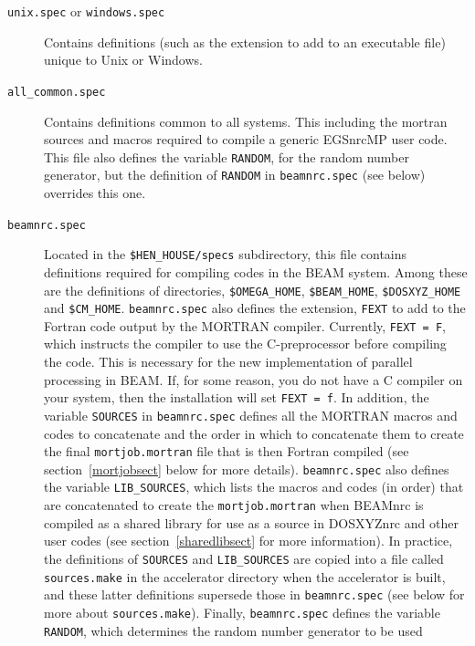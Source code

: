 \documentclass[12pt,twoside]{article}
\begin{document}
\begin{description}
\item [{\tt unix.spec} or {\tt windows.spec}]  Contains definitions
(such as the extension to add to an executable file) unique to Unix or
Windows.
\item [{\tt all\_common.spec}] Contains definitions common to all systems.
This including the mortran sources and macros required to compile a
generic EGSnrcMP user code.  This file also defines the variable
{\tt RANDOM}, for the random number generator, but the definition
of {\tt RANDOM} in {\tt beamnrc.spec} (see below) overrides this one.
\item [{\tt beamnrc.spec}] Located in the {\tt \$HEN\_HOUSE/specs}
subdirectory, this file contains definitions required for
compiling codes in the BEAM system.  Among these
are the definitions of directories, {\tt \$OMEGA\_HOME},
{\tt \$BEAM\_HOME}, {\tt \$DOSXYZ\_HOME} and {\tt \$CM\_HOME}.
{\tt beamnrc.spec} also defines the extension, {\tt FEXT} to add to the Fortran code
output by the MORTRAN compiler.  Currently, {\tt FEXT = F}, which instructs
the compiler to use the C-preprocessor before compiling the code.  This is
necessary for the new implementation of parallel processing in BEAM.  If, for some reason, you do not have a C compiler on your system, then the installation
will set {\tt FEXT = f}.  In addition, the variable {\tt SOURCES} in
{\tt beamnrc.spec} defines all the MORTRAN macros and codes
to concatenate and the order in which to concatenate them to
create the final {\tt mortjob.mortran} file that is then Fortran compiled
(see section~\ref{mortjobsect} below for more details).  {\tt beamnrc.spec}
also defines the variable {\tt LIB\_SOURCES}, which lists the macros
and codes (in order) that are concatenated to create the
{\tt mortjob.mortran} when BEAMnrc is compiled as a shared library
for use as a source in DOSXYZnrc and other user codes
(see section~\ref{sharedlibsect} for more information).  In practice, the
definitions of {\tt SOURCES} and {\tt LIB\_SOURCES} are copied into
a file called {\tt sources.make} in the accelerator directory when the
accelerator is built, and these latter definitions supersede those in
{\tt beamnrc.spec} (see below for more about {\tt sources.make}).
Finally, {\tt beamnrc.spec} defines the variable
{\tt RANDOM}, which determines the random number generator to be used

\end{description}
\end{document}
